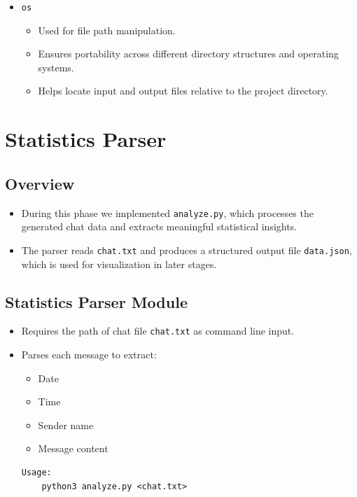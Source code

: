 \documentclass[11pt,a4paper]{article}
\begin{document}
\begin{itemize}
    \item \texttt{os}
    \begin{itemize}
        \item Used for file path manipulation.
        \item Ensures portability across different directory structures and operating systems.
        \item Helps locate input and output files relative to the project directory.
    \end{itemize}
\end{itemize}
\newpage




























\section{Statistics Parser}

\subsection{Overview}
\begin{itemize}
\item During this phase we implemented \texttt{analyze.py}, which processes the generated chat data and extracts meaningful statistical insights.
\item The parser reads \texttt{chat.txt} and produces a structured output file \texttt{data.json}, which is used for visualization in later stages.
\end{itemize}

\subsection{Statistics Parser Module}
\begin{itemize}
\item Requires the path of chat file \texttt{chat.txt} as command line input.
\item Parses each message to extract:
\begin{itemize}
    \item Date
    \item Time
    \item Sender name
    \item Message content
\end{itemize}

\begin{verbatim}
Usage:
    python3 analyze.py <chat.txt>
\end{verbatim}
\end{itemize}
\end{document}
